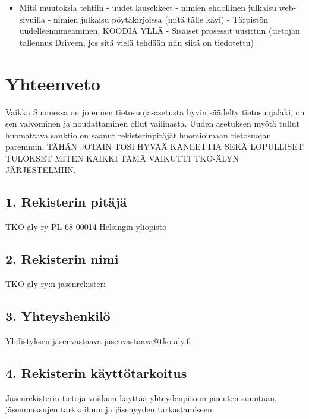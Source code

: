 \documentclass[finnish]{tktltiki}
\begin{document}
\begin{itemize}
\item Mitä muutoksia tehtiin
\subitem - uudet lausekkeet
\subitem - nimien ehdollinen julkaisu web-sivuilla
\subitem - nimien julkaisu pöytäkirjoissa (mitä tälle kävi)
\subitem - Tärpistön uudelleennimeäminen, KOODIA YLLÄ
\subitem - Sisäiset prosessit uusittiin (tietojan tallennus Driveen, jos sitä vielä tehdään niin siitä on tiedotettu)
\end{itemize}

\section{Yhteenveto}
Vaikka Suomessa on jo ennen tietosuoja-asetusta hyvin säädelty tietosuojalaki, on sen valvominen ja noudattaminen ollut vailinasta. Uuden asetuksen myötä tullut huomattava sanktio on saanut rekisterinpitäjät huomioimaan tietosuojan paremmin. TÄHÄN JOTAIN TOSI HYVÄÄ KANEETTIA SEKÄ LOPULLISET TULOKSET MITEN KAIKKI TÄMÄ VAIKUTTI TKO-ÄLYN JÄRJESTELMIIN.


\newpage
\nocite{*}
%

%

%



\lastpage

\appendices

\pagestyle{empty}


\subsection*{1. Rekisterin pitäjä}
TKO-äly ry
PL 68
00014 Helsingin yliopisto

\subsection*{2. Rekisterin nimi}
TKO-äly ry:n jäsenrekisteri

\subsection*{3. Yhteyshenkilö}
Yhdistyksen jäsenvastaava
jasenvastaava@tko-aly.fi

\subsection*{4. Rekisterin käyttötarkoitus}
Jäsenrekisterin tietoja voidaan käyttää yhteydenpitoon jäsenten suuntaan, jäsenmaksujen tarkkailuun ja jäsenyyden tarkastamiseen.
\end{document}
